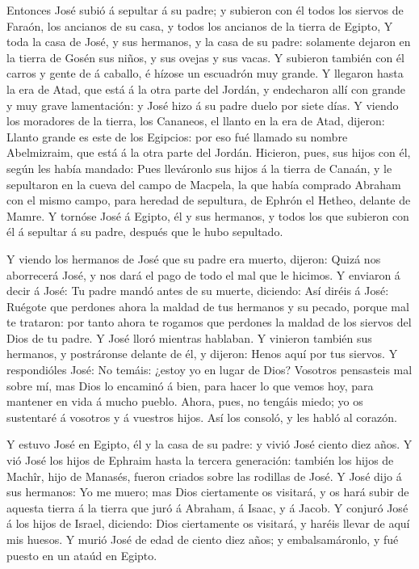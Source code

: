  Entonces José subió á sepultar á su padre; y subieron con
él todos los siervos de Faraón, los ancianos de su casa, y todos los
ancianos de la tierra de Egipto,  Y toda la casa de José, y
sus hermanos, y la casa de su padre: solamente dejaron en la tierra de
Gosén sus niños, y sus ovejas y sus vacas.  Y subieron
también con él carros y gente de á caballo, é hízose un escuadrón muy
grande.  Y llegaron hasta la era de Atad, que está á la
otra parte del Jordán, y endecharon allí con grande y muy grave
lamentación: y José hizo á su padre duelo por siete días. 
Y viendo los moradores de la tierra, los Cananeos, el llanto en la era
de Atad, dijeron: Llanto grande es este de los Egipcios: por eso fué
llamado su nombre Abelmizraim, que está á la otra parte del Jordán.
 Hicieron, pues, sus hijos con él, según les había mandado:
 Pues lleváronlo sus hijos á la tierra de Canaán, y le
sepultaron en la cueva del campo de Macpela, la que había comprado
Abraham con el mismo campo, para heredad de sepultura, de Ephrón el
Hetheo, delante de Mamre.  Y tornóse José á Egipto, él y
sus hermanos, y todos los que subieron con él á sepultar á su padre,
después que le hubo sepultado.

 Y viendo los hermanos de José que su padre era muerto,
dijeron: Quizá nos aborrecerá José, y nos dará el pago de todo el mal
que le hicimos.  Y enviaron á decir á José: Tu padre mandó
antes de su muerte, diciendo:  Así diréis á José: Ruégote
que perdones ahora la maldad de tus hermanos y su pecado, porque mal te
trataron: por tanto ahora te rogamos que perdones la maldad de los
siervos del Dios de tu padre. Y José lloró mientras hablaban.
 Y vinieron también sus hermanos, y postráronse delante de
él, y dijeron: Henos aquí por tus siervos.  Y respondióles
José: No temáis: ¿estoy yo en lugar de Dios?  Vosotros
pensasteis mal sobre mí, mas Dios lo encaminó á bien, para hacer lo que
vemos hoy, para mantener en vida á mucho pueblo.  Ahora,
pues, no tengáis miedo; yo os sustentaré á vosotros y á vuestros hijos.
Así los consoló, y les habló al corazón.

 Y estuvo José en Egipto, él y la casa de su padre: y vivió
José ciento diez años.  Y vió José los hijos de Ephraim
hasta la tercera generación: también los hijos de Machîr, hijo de
Manasés, fueron criados sobre las rodillas de José.  Y José
dijo á sus hermanos: Yo me muero; mas Dios ciertamente os visitará, y os
hará subir de aquesta tierra á la tierra que juró á Abraham, á Isaac, y
á Jacob.  Y conjuró José á los hijos de Israel, diciendo:
Dios ciertamente os visitará, y haréis llevar de aquí mis huesos.
 Y murió José de edad de ciento diez años; y
embalsamáronlo, y fué puesto en un ataúd en Egipto.
